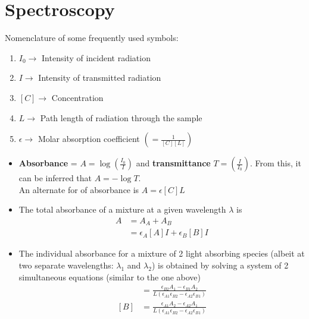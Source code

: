\documentclass[a4paper]{article}
\begin{document}
\section{Spectroscopy}
Nomenclature of some frequently used symbols:
\begin{enumerate}
    \item $I_0 \rightarrow$ Intensity of incident radiation
     \item $I \rightarrow$ Intensity of transmitted radiation
    \item $[C] \rightarrow$ Concentration
    \item $L \rightarrow$ Path length of radiation through the sample
    \item $\epsilon \rightarrow$ Molar absorption coefficient $\left(=\frac{1}{[C][L]}\right)$
\end{enumerate}
\begin{itemize}
    \item  \textbf{Absorbance} = $A = \log{\left(\frac{I_0}{I}\right)}$ and \textbf{transmittance} $T = \left(\frac{I}{I_0}\right)$. From this, it can be inferred that $A = -\log{T}$.\\
    An alternate for of absorbance is $A = \epsilon [C]L$
    \item The total absorbance of a mixture at a given wavelength $\lambda$ is
    \begin{align*}
        A &= A_A + A_B\\
        &= \epsilon_A[A]I + \epsilon_B[B]I
    \end{align*}
    \item The individual absorbance for a mixture of 2 light absorbing species (albeit at two separate wavelengths: $\lambda_1$ and $\lambda_2$) is obtained by solving a system of 2 simultaneous equations (similar to the one above)
    \begin{align*}
        [A] &= \frac{\epsilon_{B2}A_1-\epsilon_{B1}A_2}{L(\epsilon_{A1}\epsilon_{B2}-\epsilon_{A2}\epsilon_{B1})}\\
        [B] &= \frac{\epsilon_{A1}A_2-\epsilon_{A2}A_1}{L(\epsilon_{A1}\epsilon_{B2}-\epsilon_{A2}\epsilon_{B1})}
    \end{align*}
\end{itemize}
\end{document}
